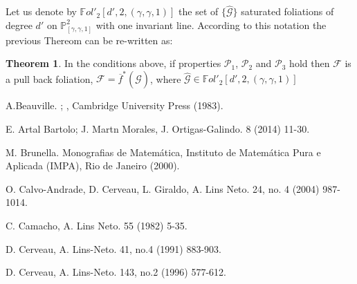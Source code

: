 \documentclass{amsart}
\theoremstyle{definition}
\theoremstyle{proposition}
\numberwithin{equation}{section}
\theoremstyle{main}
\newtheorem{main}{Theorem}
\begin{document}
Let us denote by $ \mathbb{F}ol'_{2}[d',2,(\gamma,\gamma,1)]$ the set of
 $\{\hat{\mathcal G}\}$  saturated foliations of degree $d'$ on $\mathbb P^2_{[\gamma,\gamma,1]}$ with one invariant line.  According to this notation the previous Thereom can be re-written as:
 
 
\begin{main}\label{teoc}
In the conditions above, if properties $\mathcal{P}_1$, $\mathcal{P}_2$ and $\mathcal{P}_3$ hold then $\mathcal F$ is a pull back foliation, $\mathcal {F}= \overline{f}^{*}(\hat{\mathcal{G}})$, where $\hat{\mathcal{G}} \in \mathbb{F}ol'_{2}[d',2,(\gamma,\gamma,1)]$
\end{main}


\begin{thebibliography}{10}

A.Beauville. ;
, Cambridge University Press (1983). 	

E. Artal Bartolo; J. Martn Morales, J. Ortigas-Galindo.
 8 (2014) 11-30.         

M. Brunella.
\newblock Monografias de Matem\'atica, Instituto de Matem\'atica Pura e Aplicada (IMPA), Rio de Janeiro (2000).

O. Calvo-Andrade, D. Cerveau, L. Giraldo, A. Lins Neto.   
  24, no. 4 (2004) 987-1014.

C. Camacho, A. Lins Neto.
 55 (1982) 5-35.

D. Cerveau, A. Lins-Neto.
  41, no.4 (1991) 883-903.

D. Cerveau, A. Lins-Neto.
 143, no.2 (1996) 577-612.


\end{thebibliography}
\end{document}
